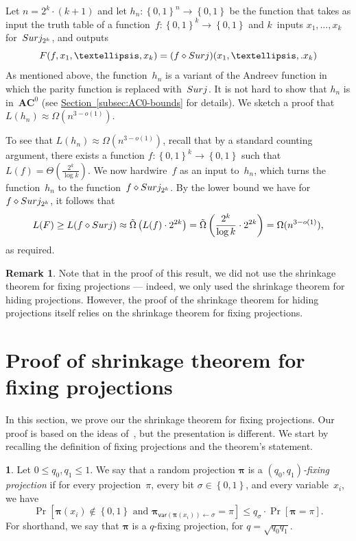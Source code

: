 \documentclass[11pt]{article}
\makeatletter
\numberwithin{equation}{section}
\theoremstyle{definition}
\newtheorem{remark}[theorem]{Remark}
\theoremstyle{plain}
\newcommand{\expref}[2]{\hyperref[#2]{#1~\ref{#2}}}
\theoremstyle{definition}\newtheorem{notation}[theorem]{Notation}\theoremstyle{plain}
\newcommand{\B}{\left\{ 0,1 \right \}}
\newcommand{\ACz}{\boldsymbol{AC}^{0}}
\newcommand{\p}{\boldsymbol{\pi}}
\newcommand{\surj}{\textup{\textsf{Surj}}}
\newcommand{\fs}{f\d\surj}
\newcommand{\var}{\mathsf{var}}
\renewcommand{\d}{\diamond}
\theoremstyle{definition}
\newtheorem*{rep@definition}{\rep@ref}
\newenvironment{repdefinition}[1]{
 \def\rep@ref{#1}
 \begin{rep@definition}}
 {\end{rep@definition}}
\theoremstyle{plain}
\makeatother
\begin{document}
Let $n=2^{k}\cdot(k+1)$ and let $h_{n}\colon\B^{n}\to\B$ be the function
that takes as input the truth table of a function~$f\colon\B^{k}\to\B$
and $k$~inputs $x_{1},\ldots,x_{k}$ for~$\surj_{2^{k}}$, and
outputs
\[
F(f,x_{1},\ldots,x_{k})=(f\d\surj)(x_{1},\ldots,.x_{k})
\]
As mentioned above, the function~$h_{n}$ is a variant of the Andreev
function in which the parity function is replaced with~$\surj$.
It is not hard to show that $h_{n}$ is in~$\ACz$ (see \expref{Section}{subsec:AC0-bounds}
for details). We sketch a proof that $L(h_{n})\approx\Omega(n^{3-o(1)})$.

To see that $L(h_{n})\approx\Omega(n^{3-o(1)})$, recall that by a
standard counting argument, there exists a function $f\colon\B^{k}\to\B$
such that $L(f)=\Theta\left(\frac{2^{k}}{\log k}\right)$. We now
hardwire~$f$ as an input to~$h_{n}$, which turns the function~$h_{n}$
to the function~$\fs_{2^{k}}$. By the lower bound we have for $\fs_{2^{k}}$,
it follows that
\[
L(F)\ge L(\fs)\approx\tilde{\Omega}\left(L(f)\cdot2^{2k}\right)=\tilde{\Omega}\left(\frac{2^{k}}{\log k}\cdot2^{2k}\right)=\Omega(n^{3-o(1)}),
\]
as required.
\begin{remark}
Note that in the proof of this result, we did not use the shrinkage
theorem for fixing projections --- indeed, we only used the shrinkage
theorem for hiding projections. However, the proof of the shrinkage
theorem for hiding projections itself relies on the shrinkage theorem for fixing
projections.
\end{remark}


\section{\label{sec:shrinkage-fixing}Proof of shrinkage theorem for fixing
projections}

In this section, we prove our the shrinkage theorem for fixing projections.
Our proof is based on the ideas of~\cite{H98}, but the presentation
is different. We start by recalling the definition of fixing projections
and the theorem's statement.
\begin{repdefinition}{\expref{Definition}{def:fixing-projections}}
Let $0\le q_{0},q_{1}\le1$. We say that a random projection $\p$
is a \emph{$(q_{0},q_{1})$-fixing projection} if for every projection~$\pi$,
every bit $\sigma\in\B$, and every variable~$x_{i}$, we have
\[
\Pr\!\left[\p(x_{i})\notin\B\text{ and }\p_{\var(\p(x_{i}))\gets\sigma}=\pi\right]\le q_{\sigma}\cdot\Pr\!\left[\p=\pi\right].
\]
For shorthand, we say that $\p$ is a $q$-fixing projection, for
$q=\sqrt{q_{0}q_{1}}$. 
\end{repdefinition}
\end{document}
